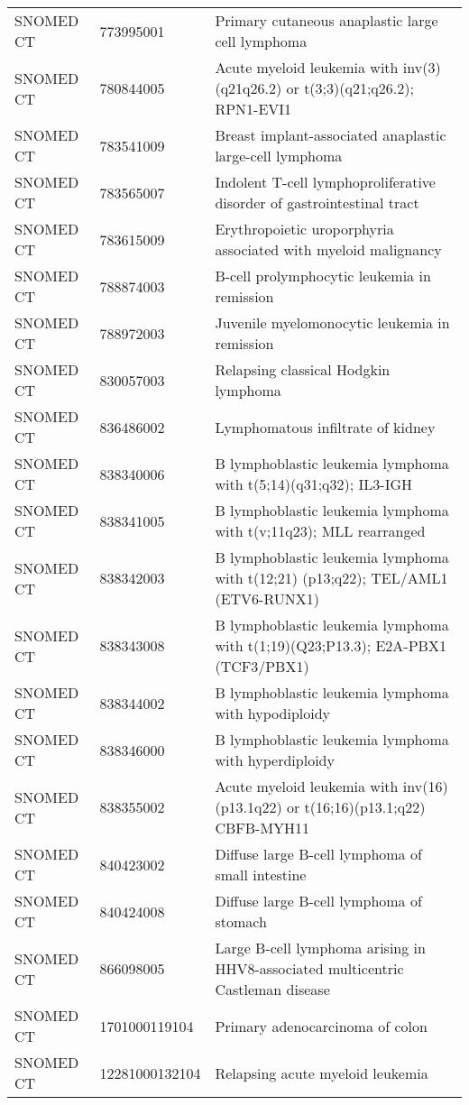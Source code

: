 \begin{longtable}{p{}p{}p{}}
  SNOMED CT & 773995001 & Primary cutaneous anaplastic large cell lymphoma \\ 
  SNOMED CT & 780844005 & Acute myeloid leukemia with inv(3)(q21q26.2) or t(3;3)(q21;q26.2); RPN1-EVI1 \\ 
  SNOMED CT & 783541009 & Breast implant-associated anaplastic large-cell lymphoma \\ 
  SNOMED CT & 783565007 & Indolent T-cell lymphoproliferative disorder of gastrointestinal tract \\ 
  SNOMED CT & 783615009 & Erythropoietic uroporphyria associated with myeloid malignancy \\ 
  SNOMED CT & 788874003 & B-cell prolymphocytic leukemia in remission \\ 
  SNOMED CT & 788972003 & Juvenile myelomonocytic leukemia in remission \\ 
  SNOMED CT & 830057003 & Relapsing classical Hodgkin lymphoma \\ 
  SNOMED CT & 836486002 & Lymphomatous infiltrate of kidney \\ 
  SNOMED CT & 838340006 & B lymphoblastic leukemia lymphoma with t(5;14)(q31;q32); IL3-IGH \\ 
  SNOMED CT & 838341005 & B lymphoblastic leukemia lymphoma with t(v;11q23); MLL rearranged \\ 
  SNOMED CT & 838342003 & B lymphoblastic leukemia lymphoma with t(12;21) (p13;q22); TEL/AML1 (ETV6-RUNX1) \\ 
  SNOMED CT & 838343008 & B lymphoblastic leukemia lymphoma with t(1;19)(Q23;P13.3); E2A-PBX1 (TCF3/PBX1) \\ 
  SNOMED CT & 838344002 & B lymphoblastic leukemia lymphoma with hypodiploidy \\ 
  SNOMED CT & 838346000 & B lymphoblastic leukemia lymphoma with hyperdiploidy \\ 
  SNOMED CT & 838355002 & Acute myeloid leukemia with inv(16)(p13.1q22) or t(16;16)(p13.1;q22) CBFB-MYH11 \\ 
  SNOMED CT & 840423002 & Diffuse large B-cell lymphoma of small intestine \\ 
  SNOMED CT & 840424008 & Diffuse large B-cell lymphoma of stomach \\ 
  SNOMED CT & 866098005 & Large B-cell lymphoma arising in HHV8-associated multicentric Castleman disease \\ 
  SNOMED CT & 1701000119104 & Primary adenocarcinoma of colon \\ 
  SNOMED CT & 12281000132104 & Relapsing acute myeloid leukemia \\ 

\end{longtable}
